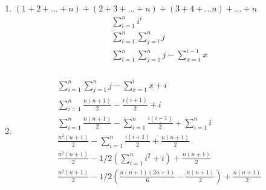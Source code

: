\documentclass{article}
\begin{document}
\begin{enumerate}
  
  \item 
  $(1+2+...+n)+(2+3+...+n)+(3+4+...n)+... +n$
   \begin{align*}
    \sum_{i=1}^{n}i^i \\
    \sum_{i=1}^{n}\sum_{j=i}^{n}j \\
    \sum_{i=1}^{n}\sum_{j=1}^{n}j - \sum_{x=1}^{i - 1}x  \\
    \end{align*}
  \item 
    \begin{align*}
    \sum_{i=1}^{n}\sum_{j=1}^{n}j - \sum_{x=1}^{i}x + i  \\
    \sum_{i=1}^{n} \frac{n(n+1)}{2} - \frac{i(i+1)}{2} + i  \\
    \sum_{i=1}^{n} \frac{n(n+1)}{2} - \sum_{i=1}^{n} \frac{i(i-1)}{2} + \sum_{i=1}^{n}i  \\
    \frac{n^2(n+1)}{2} - \sum_{i=1}^{n} \frac{i(i+1)}{2} + \frac{n(n+1)}{2}  \\
    \frac{n^2(n+1)}{2} - 1/2(\sum_{i=1}^{n} i^2+i) + \frac{n(n+1)}{2}\\
    \frac{n^2(n+1)}{2} - 1/2(\frac{n(n+1)(2n +1)}{6}- \frac{n(n+1)}{2}) + \frac{n(n+1)}{2} 
   \end{align*}

  

  \end{enumerate}
  
\end{document}
